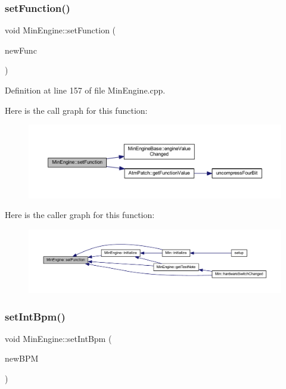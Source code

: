 \subsubsection{\texorpdfstring{set\+Function()}{setFunction()}}
{\footnotesize\ttfamily void Min\+Engine\+::set\+Function (\begin{DoxyParamCaption}\item[{\hyperlink{class_min_engine_a30e1f14df71447889a8a5060cff6fbd8}{Min\+Engine\+::\+Func}}]{new\+Func }\end{DoxyParamCaption})}



Definition at line 157 of file Min\+Engine.\+cpp.

Here is the call graph for this function\+:
\nopagebreak
\begin{figure}[H]
\begin{center}
\leavevmode
\includegraphics[width=350pt]{d4/d0f/class_min_engine_a33949965a982b0d8e690ebc781e33977_cgraph}
\end{center}
\end{figure}
Here is the caller graph for this function\+:
\nopagebreak
\begin{figure}[H]
\begin{center}
\leavevmode
\includegraphics[width=350pt]{d4/d0f/class_min_engine_a33949965a982b0d8e690ebc781e33977_icgraph}
\end{center}
\end{figure}
\mbox{\label{class_min_engine_a7ef07f3911096d861e030cccfd8899b5}} 
\subsubsection{\texorpdfstring{set\+Int\+Bpm()}{setIntBpm()}}
{\footnotesize\ttfamily void Min\+Engine\+::set\+Int\+Bpm (\begin{DoxyParamCaption}\item[{unsigned char}]{new\+B\+PM }\end{DoxyParamCaption})}



